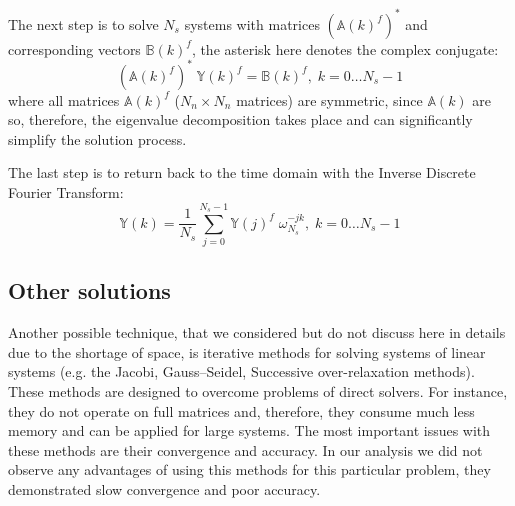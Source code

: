 The next step is to solve $N_s$ systems with matrices $(\mathbb{A}(k)^f)^{\ast}$ and corresponding vectors $\mathbb{B}(k)^f$, the asterisk here denotes the complex conjugate:
\[
  (\mathbb{A}(k)^f)^{\ast} \; \mathbb{Y}(k)^f = \mathbb{B}(k)^f, \; k = 0 \dots N_s - 1
\]
where all matrices $\mathbb{A}(k)^f$ ($N_n \times N_n$ matrices) are symmetric, since $\mathbb{A}(k)$ are so, therefore, the eigenvalue decomposition takes place and can significantly simplify the solution process.

The last step is to return back to the time domain with the Inverse Discrete Fourier Transform:
\[
  \mathbb{Y}(k) = \frac{1}{N_s} \sum_{j = 0}^{N_s - 1} \mathbb{Y}(j)^f \; \omega_{N_s}^{-jk}, \; k = 0 \dots N_s - 1
\]

\subsection{Other solutions}
Another possible technique, that we considered but do not discuss here in details due to the shortage of space, is iterative methods for solving systems of linear systems (e.g. the Jacobi, Gauss–Seidel, Successive over-relaxation methods). These methods are designed to overcome problems of direct solvers. For instance, they do not operate on full matrices and, therefore, they consume much less memory and can be applied for large systems. The most important issues with these methods are their convergence and accuracy. In our analysis we did not observe any advantages of using this methods for this particular problem, they demonstrated slow convergence and poor accuracy.
